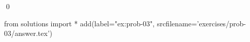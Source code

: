 
\begin{ex} 
  \label{ex:prob-03}
  
  \qed
\end{ex} 
\begin{python0}
from solutions import *
add(label="ex:prob-03",
    srcfilename='exercises/prob-03/answer.tex') 
\end{python0}

